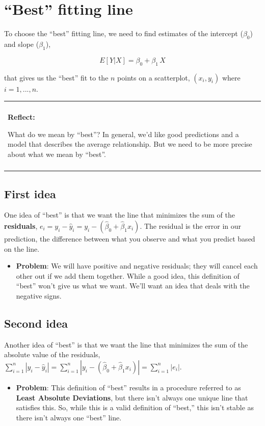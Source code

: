 \documentclass[
]{book}
\providecommand{\tightlist}{%
  \setlength{\itemsep}{0pt}\setlength{\parskip}{0pt}}
\newenvironment{reflect}
{
    \begin{center}
    
    \begin{tabular}{|p{0.8\textwidth}|}
    \rowcolor{LightBlue}
    \hline\\
    \rowcolor{LightBlue}
    \textbf{Reflect:}
}
{
    \\\rowcolor{LightBlue}
    \\\hline
    \end{tabular} 
    \end{center}
}
\begin{document}
\section{``Best'' fitting line}\label{best-fitting-line}

To choose the ``best'' fitting line, we need to find estimates of the intercept (\(\beta_0\)) and slope (\(\beta_1\)),

\[ E[Y | X] =  \beta_0 + \beta_1\,X \]

that gives us the ``best'' fit to the \(n\) points on a scatterplot, \((x_i,y_i)\) where \(i=1,...,n\).

\begin{reflect}
What do we mean by ``best''? In general, we'd like good predictions and
a model that describes the average relationship. But we need to be more
precise about what we mean by ``best''.
\end{reflect}

\subsection{First idea}\label{first-idea}

One idea of ``best'' is that we want the line that minimizes the sum of the \textbf{residuals}, \(e_i = y_i - \hat{y}_i = y_i - ( \hat{\beta}_0 + \hat{\beta}_1x_i)\). The residual is the error in our prediction, the difference between what you observe and what you predict based on the line.

\begin{itemize}
\tightlist
\item
  \textbf{Problem}: We will have positive and negative residuals; they will cancel each other out if we add them together. While a good idea, this definition of ``best'' won't give us what we want. We'll want an idea that deals with the negative signs.
\end{itemize}

\subsection{Second idea}\label{second-idea}

Another idea of ``best'' is that we want the line that minimizes the sum of the absolute value of the residuals, \(\sum_{i=1}^n |y_i - \hat{y}_i| = \sum_{i=1}^n |y_i - ( \hat{\beta}_0 + \hat{\beta}_1x_i)| =  \sum_{i=1}^n |e_i|\).

\begin{itemize}
\tightlist
\item
  \textbf{Problem}: This definition of ``best'' results in a procedure referred to as \textbf{Least Absolute Deviations}, but there isn't always one unique line that satisfies this. So, while this is a valid definition of ``best,'' this isn't stable as there isn't always one ``best'' line.
\end{itemize}
\end{document}

